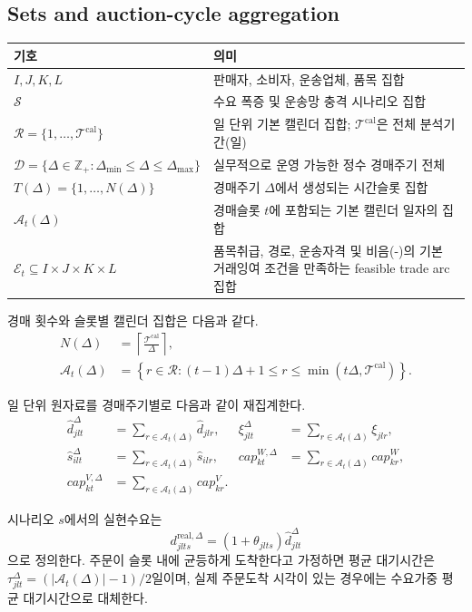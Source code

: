 \documentclass[11pt,a4paper]{article}
\newcommand{\Tcal}{\mathcal{T}^{\mathrm{cal}}}
\newcommand{\Scen}{\mathcal{S}}
\newcommand{\Dset}{\mathcal{D}}
\newcommand{\Aset}{\mathcal{A}}
\newcommand{\Eset}{\mathcal{E}}
\newcommand{\Rset}{\mathcal{R}}
\newcommand{\Zp}{\mathbb{Z}_{+}}
\begin{document}
\subsection{Sets and auction-cycle aggregation}
\begin{longtable}{@{}p{}p{}@{}}
\toprule
기호 & 의미 \\
\midrule
$I,J,K,L$ & 판매자, 소비자, 운송업체, 품목 집합 \\
$\Scen$ & 수요 폭증 및 운송망 충격 시나리오 집합 \\
$\Rset=\{1,\ldots,\Tcal\}$ & 일 단위 기본 캘린더 집합; $\Tcal$은 전체 분석기간(일) \\
$\Dset=\{\Delta\in\Zp:\Delta_{\min}\le\Delta\le\Delta_{\max}\}$ & 실무적으로 운영 가능한 정수 경매주기 전체 \\
$T(\Delta)=\{1,\ldots,N(\Delta)\}$ & 경매주기 $\Delta$에서 생성되는 시간슬롯 집합 \\
$\Aset_t(\Delta)$ & 경매슬롯 $t$에 포함되는 기본 캘린더 일자의 집합 \\
$\Eset_t\subseteq I\times J\times K\times L$ & 품목취급, 경로, 운송자격 및 비음(-)의 기본 거래잉여 조건을 만족하는 feasible trade arc 집합 \\
\bottomrule
\end{longtable}

경매 횟수와 슬롯별 캘린더 집합은 다음과 같다.
\begin{align}
N(\Delta)&=\left\lceil\frac{\Tcal}{\Delta}\right\rceil, \\
\Aset_t(\Delta)&=\left\{r\in\Rset:(t-1)\Delta+1\le r\le \min(t\Delta,\Tcal)\right\}.
\end{align}

일 단위 원자료를 경매주기별로 다음과 같이 재집계한다.
\begin{align}
\hat d^{\Delta}_{jlt}&=\sum_{r\in\Aset_t(\Delta)}\hat d_{jlr}, &
\xi^{\Delta}_{jlt}&=\sum_{r\in\Aset_t(\Delta)}\xi_{jlr}, \\
\hat s^{\Delta}_{ilt}&=\sum_{r\in\Aset_t(\Delta)}\hat s_{ilr}, &
cap^{W,\Delta}_{kt}&=\sum_{r\in\Aset_t(\Delta)}cap^W_{kr}, \\
cap^{V,\Delta}_{kt}&=\sum_{r\in\Aset_t(\Delta)}cap^V_{kr}. &&
\end{align}

시나리오 $s$에서의 실현수요는
\begin{equation}
d^{\mathrm{real},\Delta}_{jlts}=(1+\theta_{jlts})\hat d^{\Delta}_{jlt}
\end{equation}
으로 정의한다. 주문이 슬롯 내에 균등하게 도착한다고 가정하면 평균 대기시간은 $\tau^{\Delta}_{jlt}=(|\Aset_t(\Delta)|-1)/2$일이며, 실제 주문도착 시각이 있는 경우에는 수요가중 평균 대기시간으로 대체한다.
\end{document}
